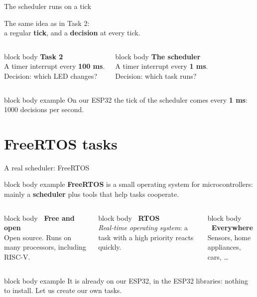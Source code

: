 \documentclass[aspectratio=169,10pt]{beamer}
\newcommand{\defbox}[1]{%
  \begin{beamercolorbox}[rounded=true,sep=0.1cm,wd=\linewidth]{block body example}
    \footnotesize #1
  \end{beamercolorbox}\vspace{0.06cm}}
\newcommand{\stepbox}[2]{%
  \begin{beamercolorbox}[rounded=true,sep=0.09cm,wd=\linewidth]{block body}
    \footnotesize\textbf{#1}\\ #2
  \end{beamercolorbox}\vspace{0.06cm}}
\newcommand{\keymsg}[1]{%
  \begin{beamercolorbox}[rounded=true,sep=0.1cm,wd=\textwidth]{block body example}
    \centering\footnotesize #1
  \end{beamercolorbox}}
\begin{document}
\begin{frame}{The scheduler runs on a tick}
  \vfill
  \begin{center}
    \large The same idea as in Task 2:\\[2pt] a regular \textbf{tick}, and a \textbf{decision} at every tick.
  \end{center}
  \vfill
  \begin{columns}[T,onlytextwidth]
      \stepbox{Task 2}{A timer interrupt every \textbf{100 ms}.\\ Decision: which LED changes?}
      \stepbox{The scheduler}{A timer interrupt every \textbf{1 ms}.\\ Decision: which task runs?}
  \end{columns}
  \vfill
  \keymsg{On our ESP32 the tick of the scheduler comes every \textbf{1 ms}: 1000 decisions per second.}
\end{frame}

\section[FreeRTOS tasks]{FreeRTOS tasks}

\begin{frame}{A real scheduler: FreeRTOS}
  \vfill
  \defbox{\textbf{FreeRTOS} is a small operating system for microcontrollers: mainly a \textbf{scheduler}
    plus tools that help tasks cooperate.}
  \vspace{0.2cm}
  \begin{columns}[T,onlytextwidth]
      \stepbox{\faCode\ Free and open}{Open source. Runs on many processors, including RISC-V.}
      \stepbox{\faStopwatch\ RTOS}{\emph{Real-time operating system}: a task with a high priority reacts quickly.}
      \stepbox{\faMicrochip\ Everywhere}{Sensors, home appliances, cars, \ldots}
  \end{columns}
  \vfill
  \keymsg{It is already on our ESP32, in the ESP32 libraries: nothing to install. Let us create our own tasks.}
\end{frame}
\end{document}
